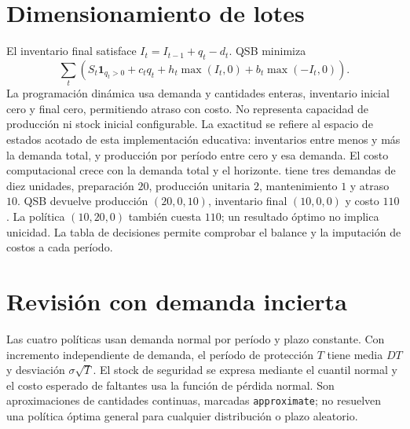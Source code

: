 \section{Dimensionamiento de lotes}
El inventario final satisface \(I_t=I_{t-1}+q_t-d_t\). QSB minimiza
\[
 \sum_t\left(S_t\mathbf{1}_{q_t>0}+c_tq_t+
 h_t\max(I_t,0)+b_t\max(-I_t,0)\right).
\]
La programación dinámica usa demanda y cantidades enteras, inventario inicial
cero y final cero, permitiendo atraso con costo. No representa capacidad de
producción ni stock inicial configurable. La exactitud se refiere al espacio
de estados acotado de esta implementación educativa: inventarios entre
menos y más la demanda total, y producción por período entre cero y esa demanda.
El costo computacional crece con la demanda total y el horizonte.
 tiene tres demandas de diez unidades, preparación
\(20\), producción unitaria \(2\), mantenimiento \(1\) y atraso \(10\).
QSB devuelve producción \((20,0,10)\), inventario final \((10,0,0)\) y costo
\(110\). La política \((10,20,0)\) también cuesta \(110\); un resultado
óptimo no implica unicidad. La tabla de decisiones permite comprobar el balance
y la imputación de costos a cada período.

\section{Revisión con demanda incierta}
Las cuatro políticas usan demanda normal por período y plazo constante.
Con incremento independiente de demanda, el período de protección \(T\)
tiene media \(DT\) y desviación \(\sigma\sqrt T\). El stock de seguridad
se expresa mediante el cuantil normal y el costo esperado de faltantes usa la
función de pérdida normal. Son aproximaciones de cantidades continuas,
marcadas \texttt{approximate}; no resuelven una política óptima general para
cualquier distribución o plazo aleatorio.

